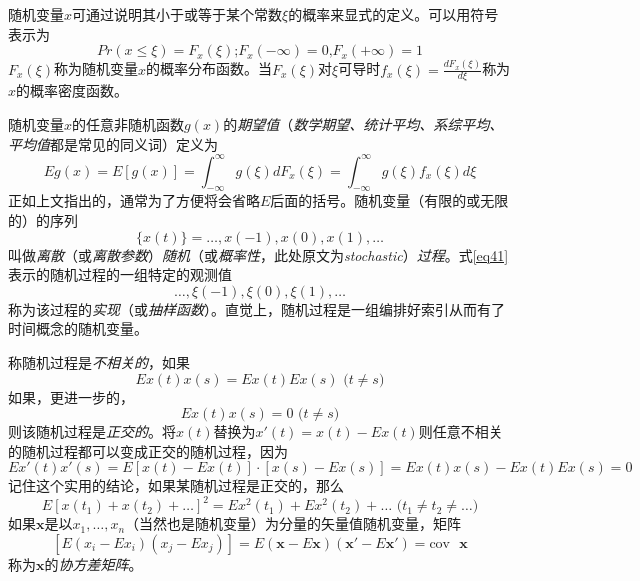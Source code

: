 \documentclass[UTF8,adobefonts]{ctexart}
\begin{document}
随机变量$x$可通过说明其小于或等于某个常数$\xi$的概率来显式的定义。可以用符号表示为
\begin{equation}
Pr(x\le\xi)=F_x(\xi)\text{;}F_x(-\infty)=0\text{,}F_x(+\infty)=1
\end{equation}
$F_x(\xi)$称为随机变量$x$的概率分布函数。当$F_x(\xi)$对$\xi$可导时$f_x(\xi)=\frac{dF_x(\xi)}{d\xi}$称为$x$的概率密度函数。

随机变量$x$的任意非随机函数$g(x)$的\emph{期望值}（\emph{数学期望、统计平均、系综平均、平均值}都是常见的同义词）定义为
\begin{equation}
\label{eq40}
Eg(x)=E[g(x)]=\int_{-\infty}^{\infty}g(\xi)dF_x(\xi)=\int_{-\infty}^{\infty}g(\xi)f_x(\xi)d\xi
\end{equation}
正如上文指出的，通常为了方便将会省略$E$后面的括号。随机变量（有限的或无限的）的序列
\begin{equation}
\label{eq41}
\{x(t)\}=\dotsc,x(-1),x(0),x(1),\dotsc
\end{equation}
叫做\emph{离散}（或\emph{离散参数}）\emph{随机}（或\emph{概率性}，此处原文为\emph{stochastic}）\emph{过程}。式\ref{eq41}表示的随机过程的一组特定的观测值
\begin{equation*}
\dotsc,\xi(-1),\xi(0),\xi(1),\dotsc
\end{equation*}
称为该过程的\emph{实现}（或\emph{抽样函数}）。直觉上，随机过程是一组编排好索引从而有了时间概念的随机变量。

称随机过程是\emph{不相关的}，如果
\begin{equation*}
Ex(t)x(s)=Ex(t)Ex(s) \text{  (} t \ne s \text{)}
\end{equation*}
如果，更进一步的，
\begin{equation*}
Ex(t)x(s)=0 \text{  (} t \ne s \text{)}
\end{equation*}
则该随机过程是\emph{正交的}。将$x(t)$替换为$x'(t)=x(t)-Ex(t)$则任意不相关的随机过程都可以变成正交的随机过程，因为
\begin{equation*}
Ex'(t)x'(s)=E[x(t)-Ex(t)]\cdot[x(s)-Ex(s)]=Ex(t)x(s)-Ex(t)Ex(s)=0
\end{equation*}
记住这个实用的结论，如果某随机过程是正交的，那么
\begin{equation*}
E[x(t_1)+x(t_2)+\dotsc]^2=Ex^2(t_1)+Ex^2(t_2)+\dotsc \text{  (}t_1 \ne t_2 \ne \dotsc \text{)}
\end{equation*}
如果$\mathbf{x}$是以$x_1,\dotsc,x_n$（当然也是随机变量）为分量的矢量值随机变量，矩阵
\begin{equation}
\label{eq42}
[E(x_i-Ex_i)(x_j-Ex_j)]=E(\mathbf{x}-E\mathbf{x})(\mathbf{x'}-E\mathbf{x'})=\mathrm{cov}\text{ }\mathbf{x}
\end{equation}
称为$\mathbf{x}$的\emph{协方差矩阵}。
\end{document}
